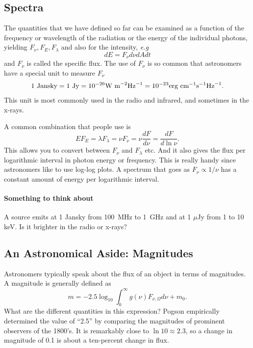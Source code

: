 \subsection{Spectra}
\label{sec:spectra}

The quantities that we have defined so far can be examined as a
function of the frequency or wavelength of the radiation or the energy
of the individual photons, yielding $F_\nu, F_E, F_\lambda$ and 
also for the intensity, {\em e.g}
\begin{equation}
d E = F_{\nu} d \nu d\!A d t
\label{eq:8}
\end{equation}
and $F_\nu$ is called the specific flux.
The use of $F_{\nu}$ is so common that astronomers have a special 
unit to measure $F_\nu$
\begin{equation}
1~\hbox{\rm Jansky} = 1~\hbox{\rm Jy} = 10^{-26} \hbox{W m}^{-2}
\hbox{Hz}^{-1} = 10^{-23} \hbox{\rm erg cm}^{-1} \hbox{s}^{-1} \hbox{Hz}^{-1}.
\label{eq:9}
\end{equation}
This unit is most commonly used in the radio and infrared, and sometimes
in the x-rays.

A common combination that people use is 
\begin{equation}
E F_E = \lambda F_\lambda = \nu F_\nu  = \nu \frac{d F}{d \nu} =
\frac{d F}{d \ln \nu}.
\label{eq:10}
\end{equation}
This allows you to convert between $F_\nu$ and $F_\lambda$ etc.  And
it also gives the flux per logarithmic interval in photon energy or
frequency.  This is really handy since astronomers like to use log-log
plots.   A spectrum that goes as $F_\nu \propto 1/\nu$ has a constant 
amount of energy per logarithmic interval.

\paragraph{Something to think about}
A source emits at 1 Jansky from 100~MHz to 1~GHz and at 1 $\mu$Jy from
1 to 10 keV.  Is it brighter in the radio or x-rays?

\subsection{An Astronomical Aside: Magnitudes}
\label{sec:an-astr-asid}

Astronomers typically speak about the flux of an object in terms of 
magnitudes.   A magnitude is generally defined as
\begin{equation}
m = -2.5 \log_{10} \int_0^\infty g(\nu) F_{\nu,\Omega} d \nu + m_0.
\label{eq:11}
\end{equation}
What are the different quantities in this expression?  Pogson
empirically determined the value of ``2.5'' by comparing the
magnitudes of prominent observers of the 1800's.   It is remarkably close
to $\ln 10 \approx 2.3$, so a change in magnitude of 0.1 is about a 
ten-percent change in flux.

